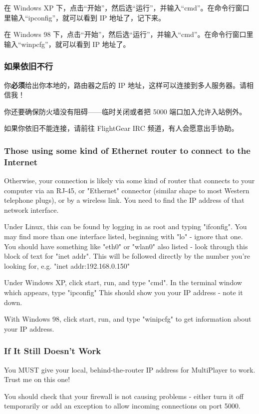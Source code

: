 在 Windows XP 下，点击“开始”，然后选“运行”，并输入“cmd”。在命令行窗口里输入“ipconfig”，就可以看到 IP 地址了，记下来。

在 Windows 98 下，点击“开始”，然后选“运行”，并输入“cmd”。在命令行窗口里输入“winpcfg”，就可以看到 IP 地址了。

\subsubsection{如果依旧不行}

你\textbf{必须}给出你本地的，路由器之后的 IP 地址，这样可以连接到多人服务器。请相信我！

你还要确保防火墙没有阻碍——临时关闭或者把 5000 端口加入允许入站例外。

如果你依旧不能连接，请前往 FlightGear IRC 频道，有人会愿意出手协助。
\fi
\iffalse
\subsubsection{Those using some kind of Ethernet router to connect to the Internet}

Otherwise, your connection is likely via some kind of router that connects to your computer via an RJ-45, or "Ethernet" connector
(similar shape to most Western telephone plugs), or by a wireless link. You need to find the IP address of that network interface.

Under Linux, this can be found by logging in as root and typing "ifconfig". You may find more than one interface listed,
beginning with "lo" - ignore that one. You should have something like "eth0" or "wlan0" also listed - look through this block
of text for "inet addr". This will be followed directly by the number you're looking for, e.g. "inet addr:192.168.0.150"

Under Windows XP, click start, run, and type "cmd". In the terminal window which appears, type "ipconfig"
This should show you your IP address - note it down.

With Windows 98, click start, run, and type "winipcfg" to get information about your IP address.

\subsubsection{If It Still Doesn't Work}

You MUST give your local, behind-the-router IP address for MultiPlayer to work. Trust me on this one!

You should check that your firewall is not causing problems - either turn it off temporarily or add an exception
to allow incoming connections on port 5000.

